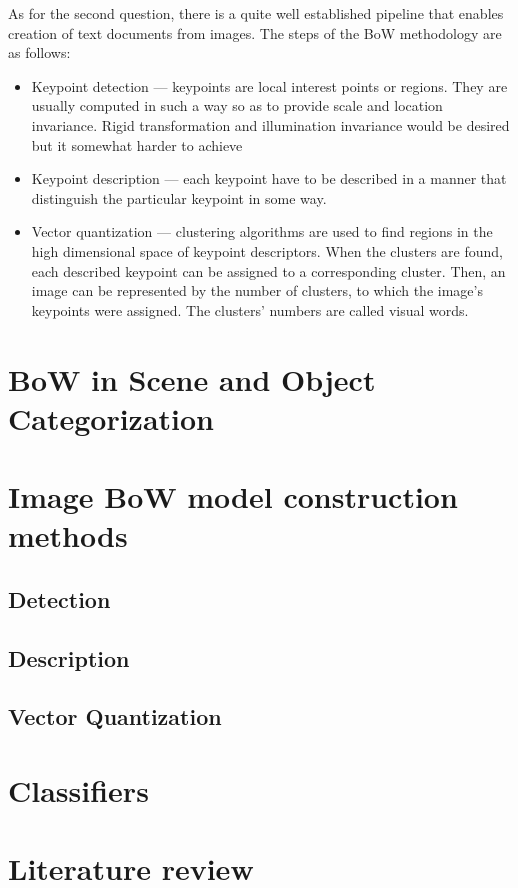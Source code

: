 \documentclass[a4paper,10pt]{article}
\begin{document}
  As for the second question, there is a quite well established pipeline that enables creation of text documents from images. The steps of the BoW methodology are as follows:
  \begin{itemize}
   \item Keypoint detection --- keypoints are local interest points or regions. They are usually computed in such a way so as to provide scale and location invariance. Rigid transformation and illumination invariance would be desired but it somewhat harder to achieve
   \item Keypoint description --- each keypoint have to be described in a manner that distinguish the particular keypoint in some way.
   \item Vector quantization --- clustering algorithms are used to find regions in the high dimensional space of keypoint descriptors. When the clusters are found, each described keypoint can be assigned to a corresponding cluster. Then, an image can be represented by the number of clusters, to which the image's keypoints were assigned. The clusters' numbers are called visual words.
  \end{itemize}
  
\section{BoW in Scene and Object Categorization}

\section{Image BoW model construction methods}

\subsection{Detection}
\subsection{Description}
\subsection{Vector Quantization}

\section{Classifiers}

\section{Literature review}


\end{document}
